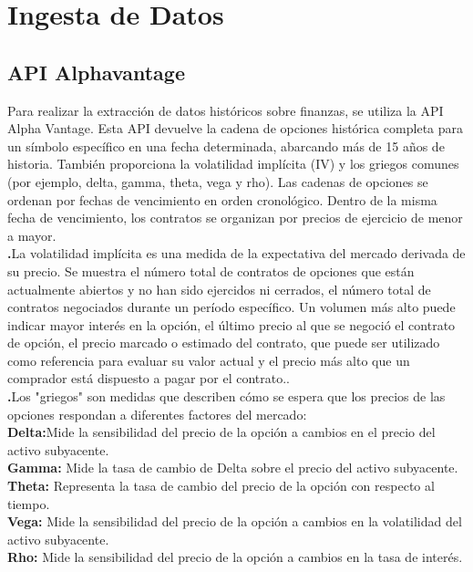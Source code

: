 \documentclass{article}
\begin{document}
    \section{Ingesta de Datos}
    \subsection{API Alphavantage }
   \begin{flushleft}
   	 Para realizar la extracción de datos históricos sobre finanzas, se utiliza la API Alpha Vantage. Esta API devuelve la cadena de opciones histórica completa para un símbolo específico en una fecha determinada, abarcando más de 15 años de historia. También proporciona la volatilidad implícita (IV) y los griegos comunes (por ejemplo, delta, gamma, theta, vega y rho). Las cadenas de opciones se ordenan por fechas de vencimiento en orden cronológico. Dentro de la misma fecha de vencimiento, los contratos se organizan por precios de ejercicio de menor a mayor.\\
   	 \vspace{0.5cm}
   	 \textbf{.}La volatilidad implícita es una medida de la expectativa del mercado derivada de su precio. Se muestra  el número total de contratos de opciones que están actualmente abiertos y no han sido ejercidos ni cerrados,  el número total de contratos negociados durante un período específico. Un volumen más alto puede indicar mayor interés en la opción, el último precio al que se negoció el contrato de opción, el precio marcado o estimado del contrato, que puede ser utilizado como referencia para evaluar su valor actual y el precio más alto que un comprador está dispuesto a pagar por el contrato..
\\
   	  \textbf{.}Los "griegos" son medidas que describen cómo se espera que los precios de las opciones respondan a diferentes factores del mercado:\\
   	 \vspace{0.5cm}
   	 \setlength{\parindent}{1.5cm}
   	 \textbf{Delta:}Mide la sensibilidad del precio de la opción a cambios en el precio del activo subyacente.\\
   	 
    \textbf{	Gamma:} Mide la tasa de cambio de Delta sobre el precio del activo subyacente.\\
   	 
   	 \textbf{Theta:} Representa la tasa de cambio del precio de la opción con respecto al tiempo.\\
   	 
   	\textbf{ Vega:} Mide la sensibilidad del precio de la opción a cambios en la volatilidad del activo subyacente.\\
   	 
   	 \textbf{Rho:} Mide la sensibilidad del precio de la opción a cambios en la tasa de interés.
   \end{flushleft}
\end{document}

